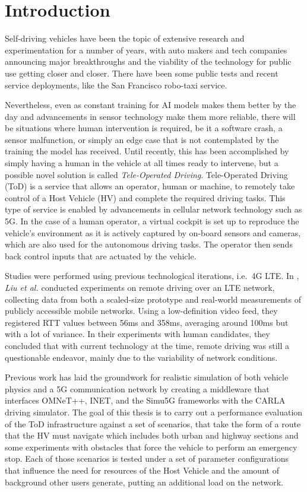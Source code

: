 {}  
\chapter*{Introduction}

Self-driving vehicles have been the topic of extensive research and experimentation for a number of years, with auto makers and tech companies announcing major breakthroughs and the viability of the technology for public use getting closer and closer. There have been some public tests and recent service deployments, like the San Francisco robo-taxi service.

Nevertheless, even as constant training for AI models makes them better by the day and advancements in sensor technology make them more reliable, there will be situations where human intervention is required, be it a software crash, a sensor malfunction, or simply an edge case that is not contemplated by the training the model has received. Until recently, this has been accomplished by simply having a human in the vehicle at all times ready to intervene, but a possible novel solution is called \textit{Tele-Operated Driving}.
Tele-Operated Driving (ToD) is a service that allows an operator, human or machine, to remotely take control of a Host Vehicle (HV) and complete the required driving tasks. This type of service is enabled by advancements in cellular network technology such as 5G.
In the case of a human operator, a virtual cockpit is set up to reproduce the vehicle's environment as it is actively captured by on-board sensors and cameras, which are also used for the autonomous driving tasks. The operator then sends back control inputs that are actuated by the vehicle.

Studies were performed using previous technological iterations, i.e.\ 4G LTE. In \cite{remote_driving_lte_network}, \textit{Liu et al.} conducted experiments on remote driving over an LTE network, collecting data from both a scaled-size prototype and real-world measurements of publicly accessible mobile networks. Using a low-definition video feed, they registered RTT values between 56ms and 358ms, averaging around 100ms but with a lot of variance. In their experiments with human candidates, they concluded that with current technology at the time, remote driving was still a questionable endeavor, mainly due to the variability of network conditions.

Previous work \cite{valeriopaper} has laid the groundwork for realistic simulation of both vehicle physics and a 5G communication network by creating a middleware that interfaces OMNeT++, INET, and the Simu5G frameworks with the CARLA driving simulator. The goal of this thesis is to carry out a performance evaluation of the ToD infrastructure against a set of scenarios, that take the form of a route that the HV must navigate which includes both urban and highway sections and some experiments with obstacles that force the vehicle to perform an emergency stop. Each of those scenarios is tested under a set of parameter configurations that influence the need for resources of the Host Vehicle and the amount of background other users generate, putting an additional load on the network.

